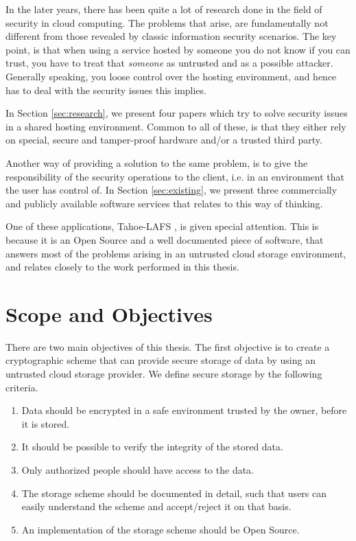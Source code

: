 \documentclass[pdftex,english,10pt,b5paper,twoside]{book}
\begin{document}
In the later years, there has been quite a lot of research done in the field of
security in cloud computing. The problems that arise, are fundamentally not
different from those revealed by classic information security scenarios. The
key point, is that when using a service hosted by someone you do not know if
you can trust, you have to treat that \emph{someone} as untrusted and as a
possible attacker. Generally speaking, you loose control over the hosting
environment, and hence has to deal with the security issues this implies.

In Section \ref{sec:research}, we present four papers \cite{PasS,
privacymanager, tccp, microsoftresearch} which try to solve security issues in
a shared hosting environment. Common to all of these, is that they either rely
on special, secure and tamper-proof hardware and/or a trusted third party.

Another way of providing a solution to the same problem, is to give the
responsibility of the security operations to the client, i.e. in an environment
that the user has control of. In Section \ref{sec:existing}, we present three
commercially and publicly available software services that relates to this way
of thinking.

One of these applications, Tahoe-\ac{LAFS} \cite{tahoe}, is given special
attention. This is because it is an Open Source and a well documented piece of
software, that answers most of the problems arising in an untrusted cloud
storage environment, and relates closely to the work performed in this thesis.

\section{Scope and Objectives}

There are two main objectives of this thesis. The first objective is to create a
cryptographic scheme that can provide secure storage of data by using an untrusted
cloud storage provider. We define secure storage by the following criteria.
\label{sec:criteria}
\begin{enumerate}
  \item Data should be encrypted in a safe environment trusted by the owner,
  before it is stored.
  \item It should be possible to verify the integrity of the stored data.
  \item Only authorized people should have access to the data.
  \item The storage scheme should be documented in detail, such that users can
  easily understand the scheme and accept/reject it on that basis. 
  \item An implementation of the storage scheme should be Open Source.
\end{enumerate}
\end{document}
